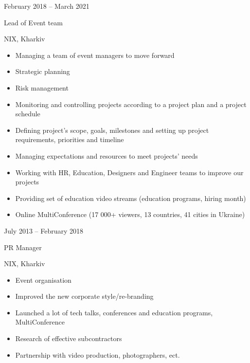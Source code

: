 \documentclass[a4paper,10pt]{article}
\newlength{\cvcolumngapwidth}
\newlength{\cvleftcolumnwidth}
\newlength{\cvrightcolumnwidth}
\newcommand{\cvtitlestyle}[1]{{\large\cvtitlefont\textcolor{cvtitlecolor}{#1}}}
\newcommand{\cvdurationstyle}[1]{{\small\cvdurationfont\textcolor{cvdurationcolor}{#1}}}
\newlength{\cvafteritemskipamount}
\newlength{\cvaftertitleskipamount}
\newlength{\cvparskip}
\newcommand{\cvitem}[2]{
    \begin{minipage}[t]{\cvleftcolumnwidth}
        \raggedleft #1
    \end{minipage}%
    \hspace{\cvcolumngapwidth}%
    \begin{minipage}[t]{\cvrightcolumnwidth}
        \setlength{\parskip}{\cvparskip} #2
    \end{minipage}

    \vspace{\cvafteritemskipamount}
}
\newcommand{\cvtitle}[1]{
    \cvtitlestyle{#1}

    \vspace{\cvaftertitleskipamount}
    \vspace{-\cvparskip}
}
\begin{document}
\cvitem{
    \cvdurationstyle{February 2018 -- March 2021}
}{
    \cvtitle{Lead of Event team}

    NIX, Kharkiv

    \begin{itemize}[leftmargin=*]
        \item Managing a team of event managers to move forward
        \item Strategic planning
        \item Risk management
        \item Monitoring and controlling projects according to a project plan and a project
schedule

        \item Defining project’s scope, goals, milestones and setting up project requirements, priorities and timeline
        \item Managing expectations and resources to meet projects’ needs

        \item Working with HR, Education, Designers and  Engineer teams  to improve our projects 
        \item Providing set of education video streams (education programs, hiring month) 
        \item Online MultiConference (17 000+ viewers, 13 countries, 41 cities in Ukraine)


             
    \end{itemize}
}

\cvitem{
    \cvdurationstyle{July 2013 -- February 2018}
}{
    \cvtitle{PR Manager}

    NIX, Kharkiv

    \begin{itemize}[leftmargin=*]
        \item Event organisation  
        \item Improved the new corporate style/re-branding
        \item Launched a lot of tech talks, conferences and education programs, MultiConference  
        \item Research of effective subcontractors 
        \item Partnership with video production, photographers, ect. 

    \end{itemize}
}


\end{document}
